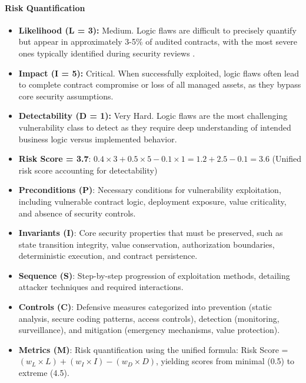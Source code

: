 \paragraph{Risk Quantification}

\begin{itemize}
\item \textbf{Likelihood (L = 3):} Medium. Logic flaws are difficult to precisely quantify but appear in approximately 3-5\% of audited contracts, with the most severe ones typically identified during security reviews \cite{zhou2023sok}.

\item \textbf{Impact (I = 5):} Critical. When successfully exploited, logic flaws often lead to complete contract compromise or loss of all managed assets, as they bypass core security assumptions.

\item \textbf{Detectability (D = 1):} Very Hard. Logic flaws are the most challenging vulnerability class to detect as they require deep understanding of intended business logic versus implemented behavior.

\item \textbf{Risk Score = 3.7}: $0.4 \times 3 + 0.5 \times 5 - 0.1 \times 1 = 1.2 + 2.5 - 0.1 = 3.6$ (Unified risk score accounting for detectability)
\end{itemize}
\begin{itemize}
\item \textbf{Preconditions (P)}: Necessary conditions for vulnerability exploitation, including vulnerable contract logic, deployment exposure, value criticality, and absence of security controls.
\item \textbf{Invariants (I)}: Core security properties that must be preserved, such as state transition integrity, value conservation, authorization boundaries, deterministic execution, and contract persistence.
\item \textbf{Sequence (S)}: Step-by-step progression of exploitation methods, detailing attacker techniques and required interactions.
\item \textbf{Controls (C)}: Defensive measures categorized into prevention (static analysis, secure coding patterns, access controls), detection (monitoring, surveillance), and mitigation (emergency mechanisms, value protection).
\item \textbf{Metrics (M)}: Risk quantification using the unified formula: Risk Score = $(w_L \times L) + (w_I \times I) - (w_D \times D)$, yielding scores from minimal (0.5) to extreme (4.5).
\end{itemize}

